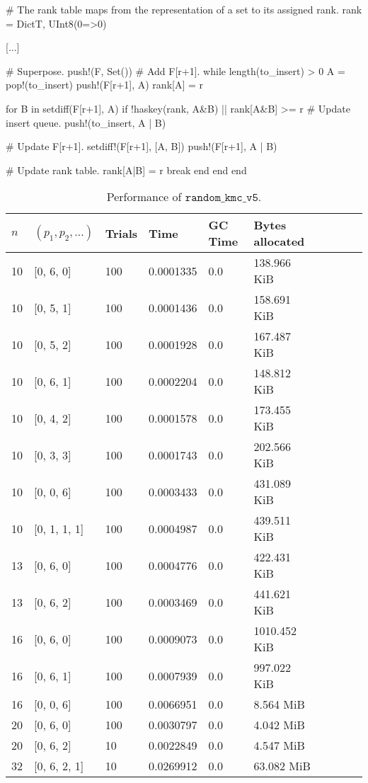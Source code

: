\begin{jllisting}
  # The rank table maps from the representation of a set to its assigned rank.
  rank = Dict{T, UInt8}(0=>0)
  
  [...]
  
  # Superpose.
  push!(F, Set()) # Add F[r+1].
  while length(to_insert) > 0
    A = pop!(to_insert)
    push!(F[r+1], A)
    rank[A] = r
  
    
    for B in setdiff(F[r+1], A)
      if !haskey(rank, A&B) || rank[A&B] >= r
        # Update insert queue.
        push!(to_insert, A | B)
    
        # Update F[r+1].
        setdiff!(F[r+1], [A, B])
        push!(F[r+1], A | B)
    
        # Update rank table.
        rank[A|B] = r
        break
      end
    end
  end
\end{jllisting}
\begin{table*}[ht!]
  \centering
  \caption{Performance of $\texttt{random\_kmc\_v5}$.}
  \label{tab:perf_v5}
  \begin{threeparttable}
    \begin{tabular}{llllllllll}
      \toprule
      $n$ & $(p_1, p_2, \ldots)$ & Trials & Time  & GC Time & Bytes allocated \\
      \midrule
      10 & [0, 6, 0] & 100 & 0.0001335 & 0.0 & 138.966 KiB \\
      10 & [0, 5, 1] & 100 & 0.0001436 & 0.0 & 158.691 KiB \\
      10 & [0, 5, 2] & 100 & 0.0001928 & 0.0 & 167.487 KiB \\
      10 & [0, 6, 1] & 100 & 0.0002204 & 0.0 & 148.812 KiB \\
      10 & [0, 4, 2] & 100 & 0.0001578 & 0.0 & 173.455 KiB \\
      10 & [0, 3, 3] & 100 & 0.0001743 & 0.0 & 202.566 KiB \\
      10 & [0, 0, 6] & 100 & 0.0003433 & 0.0 & 431.089 KiB \\
      10 & [0, 1, 1, 1] & 100 & 0.0004987 & 0.0 & 439.511 KiB \\
      13 & [0, 6, 0] & 100 & 0.0004776 & 0.0 & 422.431 KiB \\
      13 & [0, 6, 2] & 100 & 0.0003469 & 0.0 & 441.621 KiB \\
      16 & [0, 6, 0] & 100 & 0.0009073 & 0.0 & 1010.452 KiB \\
      16 & [0, 6, 1] & 100 & 0.0007939 & 0.0 & 997.022 KiB \\
      16 & [0, 0, 6] & 100 & 0.0066951 & 0.0 & 8.564 MiB \\
      20 & [0, 6, 0] & 100 & 0.0030797 & 0.0 & 4.042 MiB  \\
      20 & [0, 6, 2] & 10 & 0.0022849 & 0.0 & 4.547 MiB  \\
      32 & [0, 6, 2, 1] & 10 & 0.0269912 & 0.0 & 63.082 MiB  \\
      \bottomrule
    \end{tabular}
  \end{threeparttable}
\end{table*}
